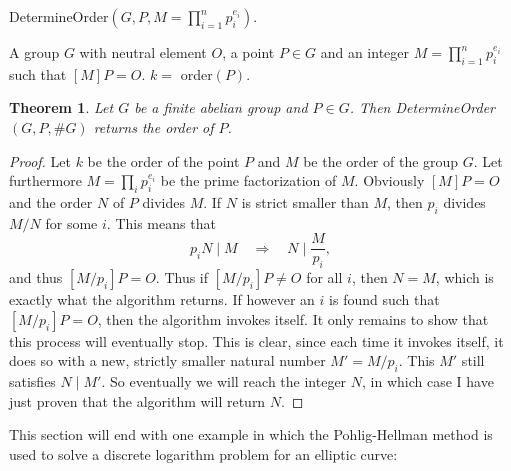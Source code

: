 \documentclass{article}
\numberwithin{equation}{section}
\newtheorem{theorem}{Theorem}[subsection]
\theoremstyle{definition}
\begin{document}
\begin{algorithm}
\caption{DetermineOrder$(G,P,M=\prod_{i=1}^n p_i^{e_i})$.}
\begin{algorithmic}[1]\label{determineorders}
  \normalsize
  \REQUIRE A group $G$ with neutral element $O$, a point $P \in G$ and an integer $M=\prod_{i=1}^n p_i^{e_i}$ such that $[M]P=O$.
  \ENSURE $k=$ order$(P)$.
  \ENDIF
  \ENDFOR
\end{algorithmic}
\end{algorithm}

\begin{theorem}
Let $G$ be a finite abelian group and $P \in G$. Then DetermineOrder$(G,P,\#G)$ returns the order of $P$.
\end{theorem} 

\begin{proof}
Let $k$ be the order of the point $P$ and $M$ be the order of the group $G$. Let furthermore $M=\prod_i p_i^{e_i}$ be the prime factorization of $M$. Obviously $[M]P=O$ and the order $N$ of $P$ divides $M$. If $N$ is strict smaller than $M$, then $p_i$ divides $M/N$ for some $i$. This means that $$p_iN \mid M \quad \Rightarrow \quad N \mid \frac{M}{p_i},$$ and thus $[M/p_i]P = O$. Thus if $[M/p_i]P \neq O$ for all $i$, then $N=M$, which is exactly what the algorithm returns. If however an $i$ is found such that $[M/p_i]P = O$, then the algorithm invokes itself. It only remains to show that this process will eventually stop. This is clear, since each time it invokes itself, it does so with a new, strictly smaller natural number $M'=M/p_i$. This $M'$ still satisfies $N \mid M'$. So eventually we will reach the integer $N$, in which case I have just proven that the algorithm will return $N$. 
\end{proof}

This section will end with one example in which the Pohlig-Hellman method is used to solve a discrete logarithm problem for an elliptic curve:
\end{document}
